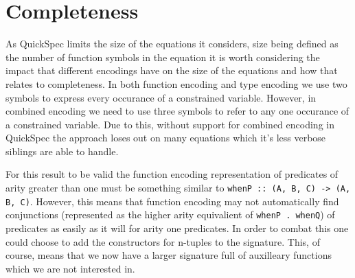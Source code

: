 \section{Completeness}

As QuickSpec limits the size
of the equations it considers, size being
defined as the number of function symbols in the
equation it is worth considering the impact that
different encodings have on the size of the equations 
and how that relates to completeness. In both
function encoding and type encoding we use two
symbols to express every occurance of
a constrained variable. However, in
combined encoding we need to use three symbols
to refer to any one occurance of a constrained variable.
Due to this, without support for combined encoding in
QuickSpec the approach loses out on many equations which
it's less verbose siblings are able to handle.

For this result to be valid the function encoding representation
of predicates of arity greater than one must be something similar to
\texttt{whenP :: (A, B, C) -> (A, B, C)}. However, this means that
function encoding may not automatically find conjunctions (represented as
the higher arity equivalient of \texttt{whenP . whenQ}) of predicates
as easily as it will for arity one predicates. In order to combat this
one could choose to add the constructors for n-tuples to the signature. This,
of course, means that we now have a larger signature full of auxilleary functions
which we are not interested in.
